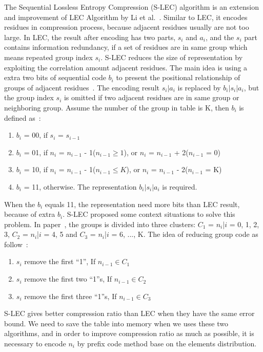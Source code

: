 The Sequential Lossless Entropy Compression (S-LEC) algorithm is an extension and improvement of LEC Algorithm by Li et
al.~\cite{li2016temporal}. Similar to LEC, it encodes residues in compression
process, because adjacent residues usually are not too large. In LEC, the result after
encoding has two parts, $s_i$ and $ a_i$, and the $s_i$ part contains
information redundancy, if a set of residues are in same group which means
repeated group index $s_i$. S-LEC reduces the size of representation by
exploiting the correlation amount adjacent residues. The main idea is using a
extra two bits of sequential code $b_i$ to present the positional relationship
of groups of adjacent residues~\cite{li2016temporal}. The encoding result
$s_i|a_i$ is replaced by $b_i|s_i|a_i$, but the group index $s_i$ is
omitted if two adjacent residues are in same group or neighboring group. Assume
the number of the group in table is K, then $b_i$ is defined
as~\cite{li2016temporal}: 

\begin{enumerate}
    \item $b_i$ = 00, if $s_i$ = $s_{i-1}$
    \item $b_i$ = 01, if $n_i$ = $n_{i-1}$ - 1($n_{i-1} \geqslant 1$), or $n_i$
    = $n_{i-1}$ + 2($n_{i-1}$ = 0)
    \item $b_i$ = 10, if $n_i$ = $n_{i-1}$ - 1($n_{i-1} \leqslant K$), or $n_i$
    = $n_{i-1}$ - 2($n_{i-1}$ = K)
    \item $b_i$ = 11, otherwise. The representation $b_i|s_i|a_i$ is required. 
  \end{enumerate}

When the $b_i$ equals 11, the representation need more bits than LEC result,
because of extra $b_i$. S-LEC proposed some context situations to solve this
problem. In paper~\cite{li2016temporal}, the groups is divided into three
clusters: $C_1$ = {$n_i$|$i$ = 0, 1, 2, 3}, $C_2$ = {$n_i$|$i$ = 4, 5} and 
$C_3$ = {$n_i$|$i$ = 6, ..., K}. The idea of reducing group code as
follow~\cite{li2016temporal}:

\begin{enumerate}
    \item $s_i$ remove the first ``1'', If $n_{i-1} \in C_1$
    \item $s_i$ remove the first two ``1''s, If $n_{i-1} \in C_2$
    \item $s_i$ remove the first three ``1''s, If $n_{i-1} \in C_3$
\end{enumerate}
S-LEC gives better compression ratio than LEC when they have the same error bound.
We need to save the table into memory when we uses these
two algorithms, and in order to improve compression ratio as much as
possible, it is necessary to encode $n_i$ by prefix code method base on the
elements distribution.

